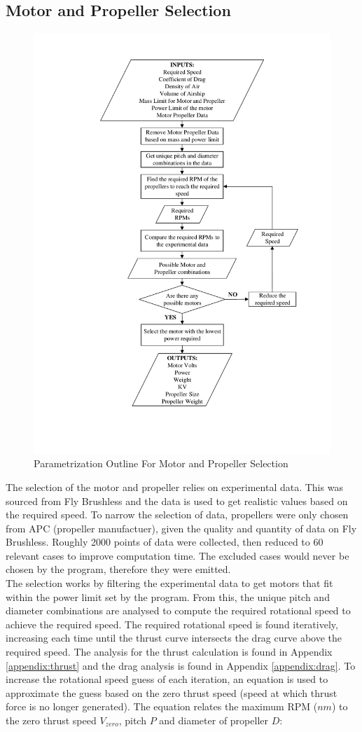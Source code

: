 \documentclass[../main.tex]{subfiles}
\begin{document}
\subsection{Motor and Propeller Selection} \label{motorSelect}

\begin{figure}[H]
	\centering
	\includegraphics[width=0.7\linewidth]{img/paramaterization/motorPropellerChoice.pdf}
	\caption{Parametrization Outline For Motor and Propeller Selection}
	\label{fig:motorOutline}
\end{figure}

The selection of the motor and propeller relies on experimental data. This was sourced from Fly Brushless \cite{motPropData} and the data is used to get realistic values based on the required speed. To narrow the selection of data, propellers were only chosen from APC (propeller manufactuer), given the quality and quantity of data on Fly Brushless. Roughly 2000 points of data were collected, then reduced to 60 relevant cases to improve computation time. The excluded cases would never be chosen by the program, therefore they were emitted.\\

The selection works by filtering the experimental data to get motors that fit within the power limit set by the program. From this, the unique pitch and diameter combinations are analysed to compute the required rotational speed to achieve the required speed. The required rotational speed is found iteratively, increasing each time until the thrust curve intersects the drag curve above the required speed. The analysis for the thrust calculation is found in Appendix \ref{appendix:thrust} and the drag analysis is found in Appendix \ref{appendix:drag}. To increase the rotational speed guess of each iteration, an equation is used to approximate the guess based on the zero thrust speed (speed at which thrust force is no longer generated). The equation relates the maximum RPM ($nm$) to the zero thrust speed $V_{zero}$, pitch $P$ and diameter of propeller $D$:
\end{document}
